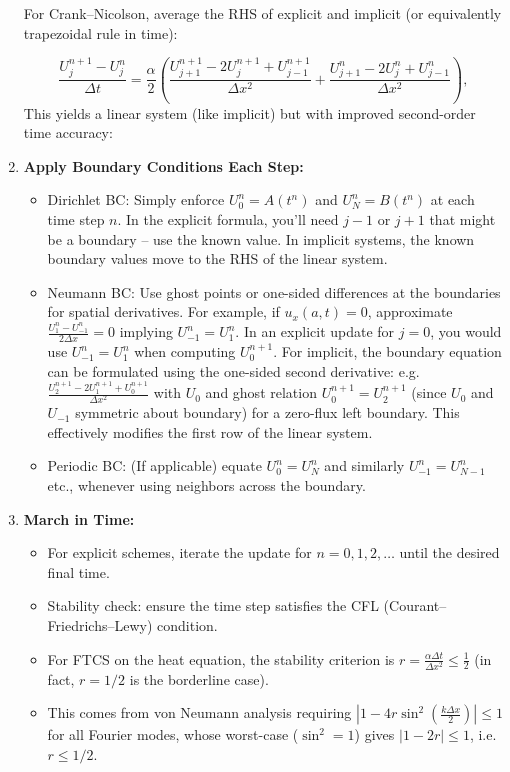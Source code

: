 \documentclass[a4paper,11pt]{report}
\begin{document}
\begin{enumerate}
          \medskip

          For Crank--Nicolson, average the RHS of explicit and implicit (or equivalently trapezoidal rule in time):

          \[
              \frac{U_j^{n+1}-U_j^n}{\Delta t} = \frac{\alpha}{2}\left(\frac{U_{j+1}^{n+1} - 2U_j^{n+1} + U_{j-1}^{n+1}}{\Delta x^2} + \frac{U_{j+1}^n - 2U_j^n + U_{j-1}^n}{\Delta x^2}\right),
          \]
          This yields a linear system (like implicit) but with improved second-order time accuracy:
    \item \textbf{Apply Boundary Conditions Each Step:}
          \begin{itemize}
              \item Dirichlet BC: Simply enforce $U_0^n = A(t^n)$ and $U_N^n = B(t^n)$ at each time step $n$. In the explicit formula, you’ll need $j-1$ or $j+1$ that might be a boundary -- use the known value. In implicit systems, the known boundary values move to the RHS of the linear system.
              \item Neumann BC: Use ghost points or one-sided differences at the boundaries for spatial derivatives. For example, if $u_x(a,t)=0$, approximate $\frac{U_1^n - U_{-1}^n}{2\Delta x}=0$ implying $U_{-1}^n = U_1^n$. In an explicit update for $j=0$, you would use $U_{-1}^n = U_1^n$ when computing $U_0^{n+1}$. For implicit, the boundary equation can be formulated using the one-sided second derivative: e.g. $\frac{U_2^{n+1}-2U_1^{n+1}+U_0^{n+1}}{\Delta x^2}$ with $U_0$ and ghost relation $U_0^{n+1}=U_2^{n+1}$ (since $U_0$ and $U_{-1}$ symmetric about boundary) for a zero-flux left boundary. This effectively modifies the first row of the linear system.
              \item Periodic BC: (If applicable) equate $U_0^n = U_N^n$ and similarly $U_{-1}^n = U_{N-1}^n$ etc., whenever using neighbors across the boundary.
          \end{itemize}
    \item \textbf{March in Time:}
          \begin{itemize}
              \item For explicit schemes, iterate the update for $n=0,1,2,\dots$ until the desired final time.
              \item Stability check: ensure the time step satisfies the CFL (Courant--Friedrichs--Lewy) condition.
              \item For FTCS on the heat equation, the stability criterion is $r = \frac{\alpha \Delta t}{\Delta x^2} \le \frac{1}{2}$ (in fact, $r=1/2$ is the borderline case)\cite{ddcampayo}.
              \item This comes from von Neumann analysis requiring $|1-4r\sin^2(\frac{k\Delta x}{2})|\le 1$ for all Fourier modes, whose worst-case ($\sin^2=1$) gives $|1-2r|\le 1$, i.e. $r\le 1/2$.


\end{itemize}
\end{enumerate}
\end{document}
